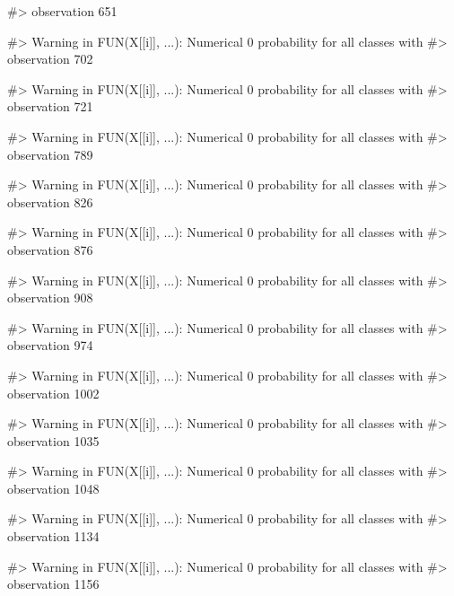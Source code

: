 \begin{Schunk}
\begin{Soutput}
#> observation 651
\end{Soutput}
\begin{Soutput}
#> Warning in FUN(X[[i]], ...): Numerical 0 probability for all classes with
#> observation 702
\end{Soutput}
\begin{Soutput}
#> Warning in FUN(X[[i]], ...): Numerical 0 probability for all classes with
#> observation 721
\end{Soutput}
\begin{Soutput}
#> Warning in FUN(X[[i]], ...): Numerical 0 probability for all classes with
#> observation 789
\end{Soutput}
\begin{Soutput}
#> Warning in FUN(X[[i]], ...): Numerical 0 probability for all classes with
#> observation 826
\end{Soutput}
\begin{Soutput}
#> Warning in FUN(X[[i]], ...): Numerical 0 probability for all classes with
#> observation 876
\end{Soutput}
\begin{Soutput}
#> Warning in FUN(X[[i]], ...): Numerical 0 probability for all classes with
#> observation 908
\end{Soutput}
\begin{Soutput}
#> Warning in FUN(X[[i]], ...): Numerical 0 probability for all classes with
#> observation 974
\end{Soutput}
\begin{Soutput}
#> Warning in FUN(X[[i]], ...): Numerical 0 probability for all classes with
#> observation 1002
\end{Soutput}
\begin{Soutput}
#> Warning in FUN(X[[i]], ...): Numerical 0 probability for all classes with
#> observation 1035
\end{Soutput}
\begin{Soutput}
#> Warning in FUN(X[[i]], ...): Numerical 0 probability for all classes with
#> observation 1048
\end{Soutput}
\begin{Soutput}
#> Warning in FUN(X[[i]], ...): Numerical 0 probability for all classes with
#> observation 1134
\end{Soutput}
\begin{Soutput}
#> Warning in FUN(X[[i]], ...): Numerical 0 probability for all classes with
#> observation 1156
\end{Soutput}
\begin{Soutput}

\end{Soutput}
\end{Schunk}
